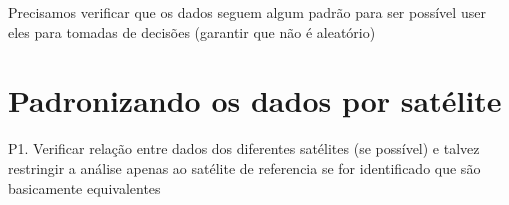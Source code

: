 \documentclass[cic,tc]{iiufrgs}
\begin{document}
Precisamos verificar que os dados seguem algum padrão para ser possível
user eles para tomadas de decisões (garantir que não é aleatório) 
\cite[Point Pattern Analysis]{geographicDataSciencePython} \par

\section{Padronizando os dados por satélite}

P1. Verificar relação entre dados dos diferentes satélites (se possível) e talvez restringir a análise apenas ao satélite de referencia se for identificado que são basicamente equivalentes \par




\end{document}
